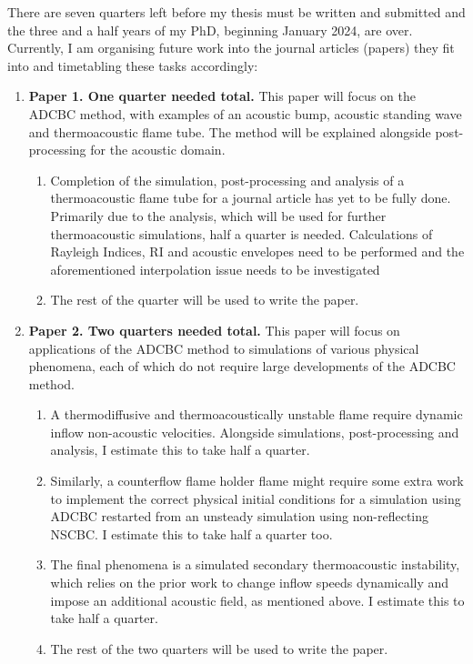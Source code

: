 There are seven quarters left before my thesis must be written and submitted and the three and a half years of my PhD, beginning January 2024, are over. Currently, I am organising future work into the journal articles (papers) they fit into and timetabling these tasks accordingly:
\begin{enumerate}
\item \textbf{Paper 1. One quarter needed total.} This paper will focus on the ADCBC method, with examples of an acoustic bump, acoustic standing wave and thermoacoustic flame tube. The method will be explained alongside post-processing for the acoustic domain.
    \begin{enumerate}
    \item Completion of the simulation, post-processing and analysis of a thermoacoustic flame tube for a journal article has yet to be fully done. Primarily due to the analysis, which will be used for further thermoacoustic simulations, half a quarter is needed. Calculations of Rayleigh Indices, RI and acoustic envelopes need to be performed and the aforementioned interpolation issue needs to be investigated
    \item The rest of the quarter will be used to write the paper.
    \end{enumerate}
\item \textbf{Paper 2. Two quarters needed total.} This paper will focus on applications of the ADCBC method to simulations of various physical phenomena, each of which do not require large developments of the ADCBC method.
    \begin{enumerate}
    \item A thermodiffusive and thermoacoustically unstable flame require dynamic inflow non-acoustic velocities. Alongside simulations, post-processing and analysis, I estimate this to take half a quarter.
    \item Similarly, a counterflow flame holder flame might require some extra work to implement the correct physical initial conditions for a simulation using ADCBC restarted from an unsteady simulation using non-reflecting NSCBC. I estimate this to take half a quarter too.
    \item The final phenomena is a simulated secondary thermoacoustic instability, which relies on the prior work to change inflow speeds dynamically and impose an additional acoustic field, as mentioned above. I estimate this to take half a quarter.
    \item The rest of the two quarters will be used to write the paper.

\end{enumerate}
\end{enumerate}
